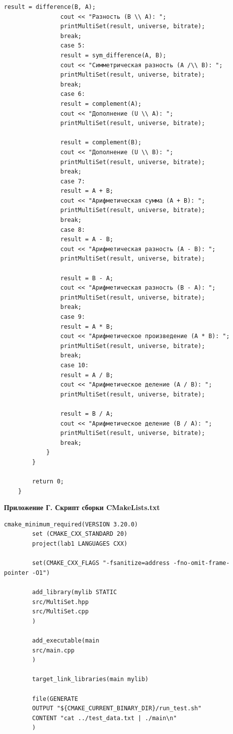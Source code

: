 \documentclass[14pt, a4paper]{extarticle}
\begin{document}
\begin{lstlisting}[caption={Файл точки входа и интерфейса main.cpp}, label={lst:main_cpp}]
				result = difference(B, A);
				cout << "Разность (B \\ A): ";
				printMultiSet(result, universe, bitrate);
				break;
				case 5:
				result = sym_difference(A, B);
				cout << "Симметрическая разность (A /\\ B): ";
				printMultiSet(result, universe, bitrate);
				break;
				case 6:
				result = complement(A);
				cout << "Дополнение (U \\ A): ";
				printMultiSet(result, universe, bitrate);
				
				result = complement(B);
				cout << "Дополнение (U \\ B): ";
				printMultiSet(result, universe, bitrate);
				break;
				case 7:
				result = A + B;
				cout << "Арифметическая сумма (A + B): ";
				printMultiSet(result, universe, bitrate);
				break;
				case 8:
				result = A - B;
				cout << "Арифметическая разность (A - B): ";
				printMultiSet(result, universe, bitrate);
				
				result = B - A;
				cout << "Арифметическая разность (B - A): ";
				printMultiSet(result, universe, bitrate);
				break;
				case 9:
				result = A * B;
				cout << "Арифметическое произведение (A * B): ";
				printMultiSet(result, universe, bitrate);
				break;
				case 10:
				result = A / B;
				cout << "Арифметическое деление (A / B): ";
				printMultiSet(result, universe, bitrate);
				
				result = B / A;
				cout << "Арифметическое деление (B / A): ";
				printMultiSet(result, universe, bitrate);
				break;
			}
		}
		
		return 0;
	}
	\end{lstlisting}
	
	\clearpage
	\begin{flushleft}
		{\bf Приложение Г. Скрипт сборки CMakeLists.txt}
	\end{flushleft}
	\label{appendix:D}
	
	\begin{lstlisting}[caption={Скрипт сборки CMakeLists.txt}, label={lst:cmakelists}]
		cmake_minimum_required(VERSION 3.20.0)
		set (CMAKE_CXX_STANDARD 20)
		project(lab1 LANGUAGES CXX)
		
		set(CMAKE_CXX_FLAGS "-fsanitize=address -fno-omit-frame-pointer -O1")
		
		add_library(mylib STATIC 
		src/MultiSet.hpp
		src/MultiSet.cpp
		)
		
		add_executable(main 
		src/main.cpp
		)
		
		target_link_libraries(main mylib)
		
		file(GENERATE 
		OUTPUT "${CMAKE_CURRENT_BINARY_DIR}/run_test.sh"
		CONTENT "cat ../test_data.txt | ./main\n"
		)
	\end{lstlisting}
	
\end{document}
